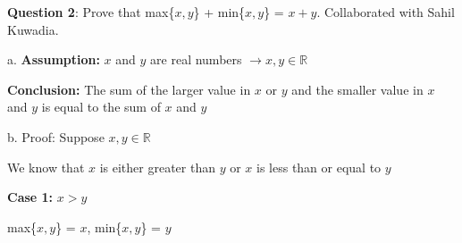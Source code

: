 \documentclass{article} %
\newcommand{\question}[2][]{\begin{flushleft}
        \textbf{Question #1}: #2
\end{flushleft}}
\begin{document}










    \newpage


    \question[2]{Prove that max\{$x, y$\} + min\{$x, y$\} = $x + y$. Collaborated with Sahil Kuwadia.}

    a. \textbf{Assumption:} $x$ and $y$ are real numbers $\rightarrow x,y \in \mathbb{R}$

    \tabto{1cm}\textbf{Conclusion:} The sum of the larger value in $x$ or $y$ and the smaller value in $x$ and $y$ is equal
    \tabto{1.05cm}to the sum of $x$ and $y$

    \vspace*{0.3cm}

    b. Proof: Suppose $x, y \in \mathbb{R}$

    \tabto{1cm} We know that $x$ is either greater than $y$ or $x$ is less than or equal to $y$

    \vspace*{0.1cm}

    \tabto{1cm} \textbf{Case 1:} $x > y$

    \tabto{1.3cm} max\{$x, y$\} = $x$, min\{$x, y$\} = $y$
\end{document}
